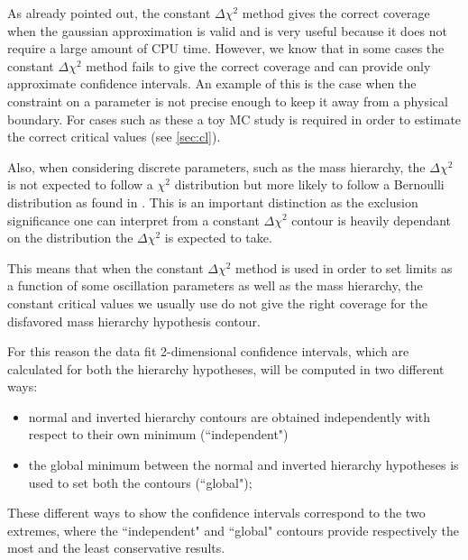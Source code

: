 As already pointed out, the constant $\Delta \chi^2$ method gives the correct coverage 
when the gaussian approximation is valid and is very useful because it does not require a large amount of CPU time.
However, we know that in some cases the constant $\Delta \chi^2$ method fails to give the correct coverage
and can provide only approximate confidence intervals.
An example of this is the case when the constraint on a parameter is not precise enough to keep it away from a physical boundary. 
For cases such as these a toy MC study is required in order to estimate the correct critical values
(see \cref{sec:cl}).

Also, when considering discrete parameters, such as the mass hierarchy, the $\Delta \chi^2$ is not expected to follow a 
$\chi^2$ distribution but more likely to follow a Bernoulli distribution as found in \cite{cl_masshierarchy}. This is an important 
distinction as the exclusion significance one can interpret from a constant $\Delta \chi^2$ contour is heavily dependant on the 
distribution the $\Delta \chi^2$ is expected to take. 


This means that when the constant $\Delta \chi^2$ method is used in order 
to set limits as a function of some oscillation parameters as well as the mass hierarchy,
the constant critical values we usually use
do not give the right coverage for the disfavored mass hierarchy hypothesis contour.

For this reason the data fit 2-dimensional confidence intervals, 
which are calculated for both the hierarchy hypotheses, 
will be computed in two different ways:
\begin{itemize}
\item normal and inverted hierarchy contours are obtained independently
	with respect to their own minimum (``independent")
\item the global minimum between the normal and inverted hierarchy hypotheses
	is used to set both the contours (``global");
\end{itemize}
These different ways to show the confidence intervals correspond
to the two extremes, where the ``independent" and ``global" contours 
provide respectively the most and the least conservative results.

